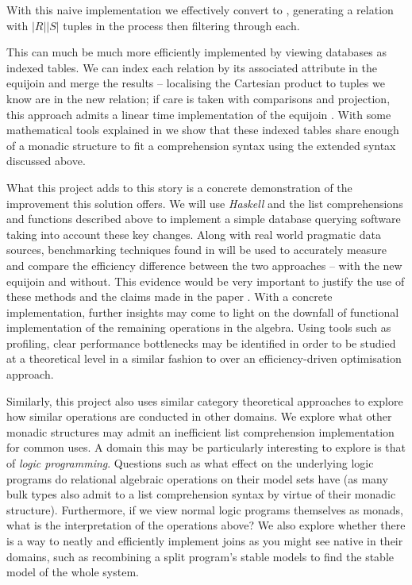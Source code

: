 With this naive implementation we effectively convert  to , generating a relation with $|R||S|$ tuples in the process then filtering through each.

This can much be much more efficiently implemented by viewing databases as indexed tables. We can index each relation by its associated attribute in the equijoin and merge the results -- localising the Cartesian product to tuples we know are in the new relation; if care is taken with comparisons and projection, this approach admits a linear time implementation of the equijoin \cite{RelationalAlgebraByWayOfAdjunctions}. With some mathematical tools explained in  we show that these indexed tables share enough of a monadic structure to fit a comprehension syntax using the extended syntax discussed above.

What this project adds to this story is a concrete demonstration of the improvement this solution offers.
We will use \emph{Haskell} and the list comprehensions and functions described above to implement a simple database querying software taking into account these key changes. Along with real world pragmatic data sources, benchmarking techniques found in  will be used to accurately measure and compare the efficiency difference between the two approaches -- with the new equijoin and without. This evidence would be very important to justify the use of these methods and the claims made in the paper \cite{RelationalAlgebraByWayOfAdjunctions}.
With a concrete implementation, further insights may come to light on the downfall of functional implementation of the remaining operations in the algebra. Using tools such as profiling, clear performance bottlenecks may be identified in order to be studied at a theoretical level in a similar fashion to \cite{RelationalAlgebraByWayOfAdjunctions} over an efficiency-driven optimisation approach.

Similarly, this project also uses similar category theoretical approaches to explore how similar operations are conducted in other domains. We explore what other monadic structures may admit an inefficient list comprehension implementation for common uses. A domain this may be particularly interesting to explore is that of \emph{logic programming}. Questions such as what effect on the underlying logic programs do relational algebraic operations on their model sets have (as many bulk types also admit to a list comprehension syntax by virtue of their monadic structure). Furthermore, if we view normal logic programs themselves as monads, what is the interpretation of the operations above? We also explore whether there is a way to neatly and efficiently implement joins as you might see native in their domains, such as recombining a split program's stable models to find the stable model of the whole system.
